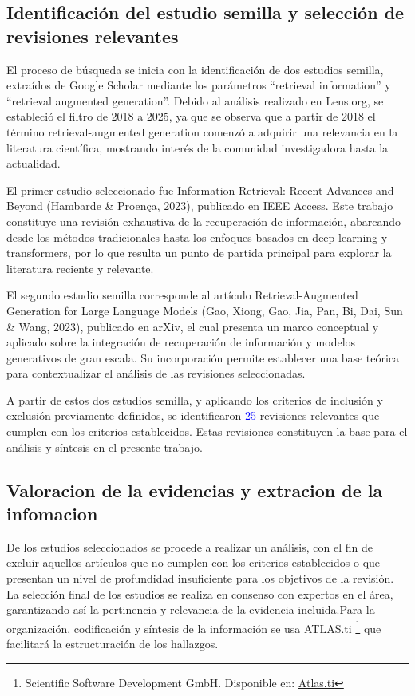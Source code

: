 \subsection{Identificación del estudio semilla y selección de revisiones relevantes}
El proceso de búsqueda se inicia con la identificación de dos estudios semilla, extraídos de Google Scholar mediante los parámetros “retrieval information” y “retrieval augmented generation”. 
Debido al análisis realizado en Lens.org, se estableció el filtro de 2018 a 2025, ya que se observa que a partir de 2018 el término retrieval-augmented generation 
comenzó a adquirir una relevancia en la literatura científica, mostrando interés de la comunidad investigadora hasta la actualidad.

El primer estudio seleccionado fue Information Retrieval: Recent Advances and Beyond (Hambarde \& Proença, 2023), publicado en IEEE Access. 
Este trabajo constituye una revisión exhaustiva de la recuperación de información, abarcando desde los métodos tradicionales hasta los enfoques 
basados en deep learning y transformers, por lo que resulta un punto de partida principal para explorar la literatura reciente y relevante.

El segundo estudio semilla corresponde al artículo Retrieval-Augmented Generation for Large Language Models (Gao, Xiong, Gao, Jia, Pan, Bi, Dai, Sun \& Wang, 2023), publicado en
arXiv,
el cual presenta un marco conceptual y aplicado sobre la integración de recuperación de información y modelos generativos de gran escala. Su incorporación permite 
establecer una base teórica para contextualizar el análisis de las revisiones seleccionadas.

A partir de estos dos estudios semilla, y aplicando los criterios de inclusión y exclusión previamente definidos, se identificaron \textcolor{blue}{25} revisiones 
relevantes que cumplen con los criterios establecidos. 
Estas revisiones constituyen la base para el análisis y síntesis en el presente trabajo.



\subsection{Valoracion de la evidencias y extracion de la infomacion}
De los estudios seleccionados se procede a realizar un análisis, 
con el fin de excluir aquellos artículos que no cumplen con los criterios establecidos 
o que presentan un nivel de profundidad insuficiente para los objetivos de la revisión. 
La selección final de los estudios se realiza en consenso con expertos en el área, 
garantizando así la pertinencia y relevancia de la evidencia incluida.Para la organización, codificación y síntesis de la 
información se usa ATLAS.ti \footnote{Scientific Software Development GmbH. Disponible en: \href{https://atlasti.com/es}{Atlas.ti}} que facilitará la estructuración de los hallazgos.





